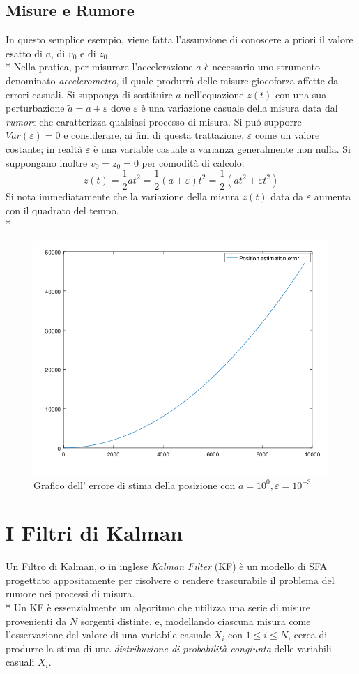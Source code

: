 \subsection{Misure e Rumore}
In questo semplice esempio, viene fatta l'assunzione di conoscere a priori il valore esatto di $a$, di $v_0$ e di $z_0$.\\*
Nella pratica, per misurare l'accelerazione $a$ \`e necessario uno strumento denominato \emph{accelerometro}, il quale produrr\`a delle misure giocoforza affette da errori casuali. Si supponga di sostituire $a$ nell'equazione $z(t)$ con una sua perturbazione $\tilde{a} = a + \varepsilon$ dove $\varepsilon$ \`e una variazione casuale della misura data dal \emph{rumore} che caratterizza qualsiasi processo di misura. Si pu\'o supporre $Var(\varepsilon) = 0$ e considerare, ai fini di questa trattazione, $\varepsilon$ come un valore costante; in realt\`a $\varepsilon$ \`e una variable casuale a varianza generalmente non nulla. Si suppongano inoltre $v_0 = z_0 = 0$ per comodit\`a di calcolo:
$$
z(t) = \frac{1}{2} \tilde{a} t^2 = \frac{1}{2}(a + \varepsilon) t^2 = \frac{1}{2} \left(at^2 + \varepsilon t^2\right)
$$
Si nota immediatamente che la variazione della misura $z(t)$ data da $\varepsilon$ aumenta con il quadrato del tempo.\\*
\begin{figure}[h]
	\centering
	\includegraphics[scale=0.5]{img/errormeas}
	\caption{Grafico dell' errore di stima della posizione con $a = 10^0, \varepsilon = 10^{-3}$}
	\label{fig:errormeas}
\end{figure}
\section{I Filtri di Kalman}
\noindent{}Un Filtro di Kalman, o in inglese \emph{Kalman Filter} (KF) \`e un modello di SFA progettato appositamente per risolvere o rendere trascurabile il problema del rumore nei processi di misura.\\*
Un KF \`e essenzialmente un algoritmo che utilizza una serie di misure provenienti da $N$ sorgenti distinte, e, modellando ciascuna misura come l'osservazione del valore di una variabile casuale $X_i$ con $1\le i \le N$, cerca di produrre la stima di una \emph{distribuzione di probabilit\`a congiunta} delle variabili casuali $X_i$.

